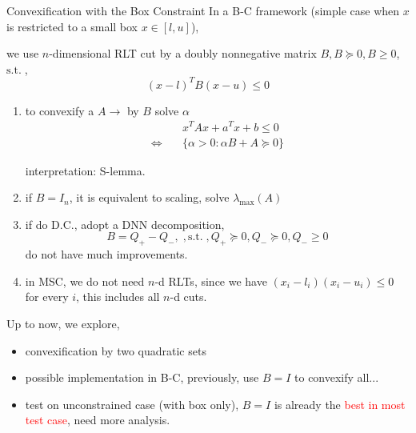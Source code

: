 \documentclass[aspectratio=1610, 10pt]{beamer}
\newcommand{\st}{\mathrm{s.t.\;}}
\newcommand{\red}[1]{\textcolor{red}{#1}}
\begin{document}
\begin{frame}[allowframebreaks]{Convexification with the Box Constraint}
  In a B-C framework (simple case when \(x\) is restricted to a small box \(x \in [l, u]\)),

  we use \(n\)-dimensional RLT cut by a doubly nonnegative matrix \(B, B \succeq 0, B \ge 0\), \(\st\),
  \begin{equation*}
    (x-l)^TB(x-u) \le 0
  \end{equation*}
  \begin{enumerate}
    \item to convexify a \(A \rightarrow\) by \(B\) solve \(\alpha\)
          \begin{align*}
                                  & x^TAx + a^Tx + b\le 0                 \\
            \Leftrightarrow \quad & \{\alpha >0: \alpha B + A \succeq 0\}
          \end{align*}

          interpretation: S-lemma.

          \framebreak

    \item if \(B= I_n\), it is equivalent to scaling, solve \(\lambda_{\max}(A)\)
    \item if do D.C., adopt a DNN decomposition,
          \begin{equation}
            B = Q_+ - Q_-,\;, \st, Q_+ \succeq 0, Q_- \succeq 0, Q_- \ge 0
          \end{equation}
          do not have much improvements.
    \item in MSC, we do not need \(n\)-d RLTs, since we have \((x_i - l_i)(x_i - u_i) \le 0\) for every \(i\), this includes all \(n\)-d cuts.
  \end{enumerate}

  Up to now, we explore,

  \begin{itemize}
    \item convexification by two quadratic sets
    \item possible implementation in B-C, previously, use \(B = I\) to convexify all...
    \item test on unconstrained case (with box only), \(B=I\) is already the \red{best in most test case}, need more analysis.
  \end{itemize}
\end{frame}
\end{document}
